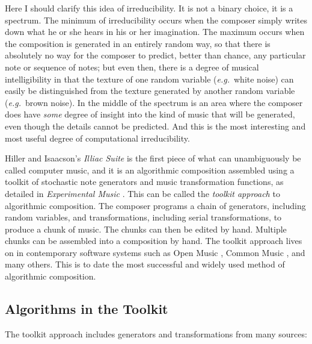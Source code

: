 \documentclass[11pt,papersize=a4]{scrartcl}
\begin{document}
Here I should clarify this idea of irreducibility. It is not a binary choice, it is a spectrum. The minimum of irreducibility occurs when the composer simply writes down what he or she hears in his or her imagination. The maximum occurs when the composition is generated in an entirely random way, so that there is absolutely no way for the composer to predict, better than chance, any particular note or sequence of notes; but even then, there is a degree of musical intelligibility in that the texture of one random variable (\emph{e.g.}\ white noise) can easily be distinguished from the texture generated by another random variable (\emph{e.g.}\ brown noise). In the middle of the spectrum is an area where the composer does have \emph{some} degree of insight into the kind of music that will be generated, even though the details cannot be predicted. And this is the most interesting and most useful degree of computational irreducibility. 

Hiller and Isaacson's \emph{Illiac Suite} \parencite{illiacsuite} is the first piece of what can unambiguously be called computer music, and it is an algorithmic composition assembled using a toolkit of stochastic note generators and music transformation functions, as detailed in \emph{Experimental Music} \parencite{hiller}. This can be called the \emph{toolkit approach} to algorithmic composition. The composer programs a chain of generators, including random variables, and transformations, including serial transformations, to produce a chunk of music. The chunks can then be edited by hand. Multiple chunks can be assembled into a composition by hand. The toolkit approach lives on in contemporary software systems such as Open Music \parencite{OpenMusic}, Common Music \parencite{CommonMusic, musx}, and many others. This is to date the most successful and widely used method of algorithmic composition. 

\subsection*{Algorithms in the Toolkit}

The toolkit approach includes generators and transformations from many sources:
\end{document}
